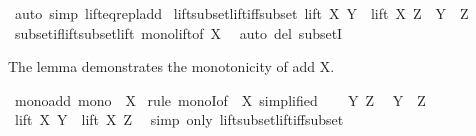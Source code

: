 \begin{isabellebody}
\isamarkupfalse%
\ {\isacharparenleft}{\kern0pt}auto\ simp{\isacharcolon}{\kern0pt}\ lift{\isacharunderscore}{\kern0pt}eq{\isacharunderscore}{\kern0pt}repl{\isacharunderscore}{\kern0pt}add{\isacharparenright}{\kern0pt}%
\endisatagproof
{\isafoldproof}%
%
\isadelimproof
\isanewline
%
\endisadelimproof
\isanewline
{}\isamarkupfalse%
\ lift{\isacharunderscore}{\kern0pt}subset{\isacharunderscore}{\kern0pt}lift{\isacharunderscore}{\kern0pt}iff{\isacharunderscore}{\kern0pt}subset{\isacharcolon}{\kern0pt}\ {\isachardoublequoteopen}lift\ X\ Y\ {\isasymsubseteq}\ lift\ X\ Z\ {\isasymlongleftrightarrow}\ Y\ {\isasymsubseteq}\ Z{\isachardoublequoteclose}\isanewline
%
\isadelimproof
\ \ %
\endisadelimproof
%
\isatagproof
{}\isamarkupfalse%
\ subset{\isacharunderscore}{\kern0pt}if{\isacharunderscore}{\kern0pt}lift{\isacharunderscore}{\kern0pt}subset{\isacharunderscore}{\kern0pt}lift\ mono{\isacharunderscore}{\kern0pt}lift{\isacharbrackleft}{\kern0pt}of\ X{\isacharbrackright}{\kern0pt}\ \isamarkupfalse%
\ {\isacharparenleft}{\kern0pt}auto\ del{\isacharcolon}{\kern0pt}\ subsetI{\isacharparenright}{\kern0pt}%
\endisatagproof
{\isafoldproof}%
%
\isadelimproof
%
\endisadelimproof
%
\begin{isamarkuptext}%
The lemma demonstrates the monotonicity of add X.%
\end{isamarkuptext}\isamarkuptrue%
\isamarkupfalse%
\ mono{\isacharunderscore}{\kern0pt}add{\isacharcolon}{\kern0pt}\ {\isachardoublequoteopen}mono\ {\isacharparenleft}{\kern0pt}{\isacharparenleft}{\kern0pt}{\isacharplus}{\kern0pt}{\isacharparenright}{\kern0pt}\ X{\isacharparenright}{\kern0pt}{\isachardoublequoteclose}\isanewline
%
\isadelimproof
%
\endisadelimproof
%
\isatagproof
{}\isamarkupfalse%
\ {\isacharparenleft}{\kern0pt}rule\ monoI{\isacharbrackleft}{\kern0pt}of\ {\isachardoublequoteopen}{\isacharparenleft}{\kern0pt}{\isacharplus}{\kern0pt}{\isacharparenright}{\kern0pt}\ X{\isachardoublequoteclose}{\isacharcomma}{\kern0pt}\ simplified{\isacharbrackright}{\kern0pt}{\isacharparenright}{\kern0pt}\isanewline
\ \ \isamarkupfalse%
\ Y\ Z\ \isamarkupfalse%
\ {\isachardoublequoteopen}Y\ {\isasymsubseteq}\ Z{\isachardoublequoteclose}\isanewline
\ \ \isamarkupfalse%
\ \isamarkupfalse%
\ {\isachardoublequoteopen}lift\ X\ Y\ {\isasymsubseteq}\ lift\ X\ Z{\isachardoublequoteclose}\ \isamarkupfalse%
\ {\isacharparenleft}{\kern0pt}simp\ only{\isacharcolon}{\kern0pt}\ lift{\isacharunderscore}{\kern0pt}subset{\isacharunderscore}{\kern0pt}lift{\isacharunderscore}{\kern0pt}iff{\isacharunderscore}{\kern0pt}subset{\isacharparenright}{\kern0pt}\isanewline

\end{isabellebody}
